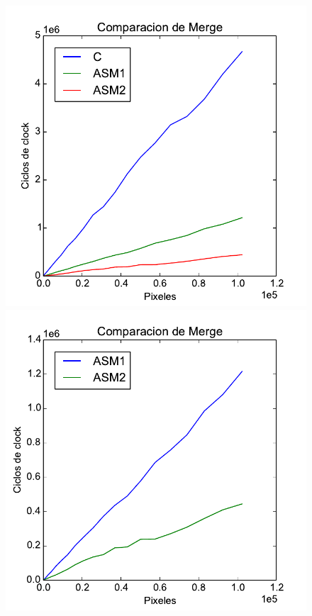 \begin{figure}[h!]
	\centering
	\includegraphics[scale=0.5]{images/c_asm1_asm2_merge_comp}
	\includegraphics[scale=0.5]{images/asm1_asm2_merge_comp}
\end{figure}
\newpage

